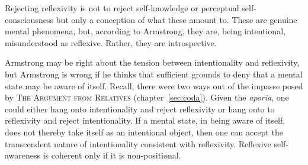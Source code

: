 Rejecting reflexivity is not to reject self-knowledge or perceptual self-conscious\-ness but only a conception of what these amount to. These are genuine mental phenomena, but, according to Armstrong, they are, being intentional, misunderstood as reflexive. Rather, they are introspective.

Armstrong may be right about the tension between intentionality and reflexivity, but Armstrong is wrong if he thinks that sufficient grounds to deny that a mental state may be aware of itself. Recall, there were two ways out of the impasse posed by \textsc{The Argument from Relatives} (chapter~\ref{sec:coda}). Given the \emph{aporia}, one could either hang onto intentionality and reject reflexivity or hang onto to reflexivity and reject intentionality. If a mental state, in being aware of itself, does not thereby take itself as an intentional object, then one can accept the transcendent nature of intentionality consistent with reflexivity. Reflexive self-awareness is coherent only if it is  non-positional. 


